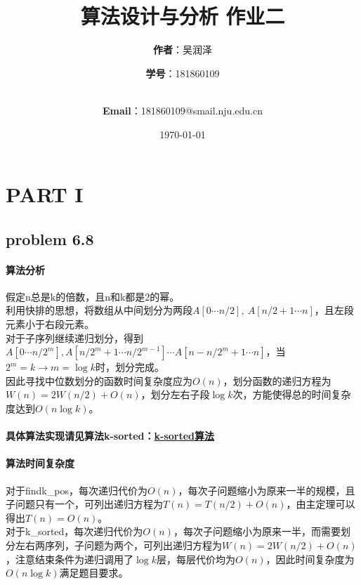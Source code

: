 \documentclass[11pt]{ctexart}
\title{\Huge\textbf{算法设计与分析 作业二}\\}
\author{\Large\textbf{作者}：吴润泽 \and{\Large\textbf{学号}：181860109}\\
	\\
	\and {\Large\textbf{Email}：181860109@smail.nju.edu.cn}\\}
\date{\Large\today}
\begin{document}
	\maketitle
	\tableofcontents
	\newpage
	\section*{PART I}
	\subsection*{problem 6.8}
		
	\paragraph{算法分析}假定n总是k的倍数，且n和k都是2的幂。\\
	\hspace*{20pt}利用快排的思想，将数组从中间划分为两段$A[0\cdots n/2],\ A[n/2+1\cdots n]$，且左段元素小于右段元素。\\
	\hspace*{20pt}对于子序列继续递归划分，得到$A[0\cdots n/2^m],A[n/2^m+1\cdots n/2^{m-1}]\cdots A[n-n/2^m+1\cdots n]$，当$2^m=k\rightarrow m=\log k$时，划分完成。\\
	\hspace*{20pt}因此寻找中位数划分的函数时间复杂度应为$O(n)$，划分函数的递归方程为$W(n)=2W(n/2)+O(n)$，划分左右子段$\log k$次，方能使得总的时间复杂度达到$O(n\log k)$。
	\paragraph{具体算法实现请见算法k-sorted：\hyperref[k-sorted]{k-sorted算法}}
	\paragraph{算法时间复杂度}
	对于findk\_pos，每次递归代价为$O(n)$，每次子问题缩小为原来一半的规模，且子问题只有一个，可列出递归方程为$T(n)=T(n/2)+O(n)$，由主定理可以得出$T(n)=O(n)$。\\
	\hspace*{20pt}对于k\_sorted，每次递归代价为$O(n)$，每次子问题缩小为原来一半，而需要划分左右两序列，子问题为两个，可列出递归方程为$W(n)=2W(n/2)+O(n)$，注意结束条件为递归调用了$\log k$层，每层代价均为$O(n)$，因此时间复杂度为$O(n\log k)$满足题目要求。
	
\end{document}
